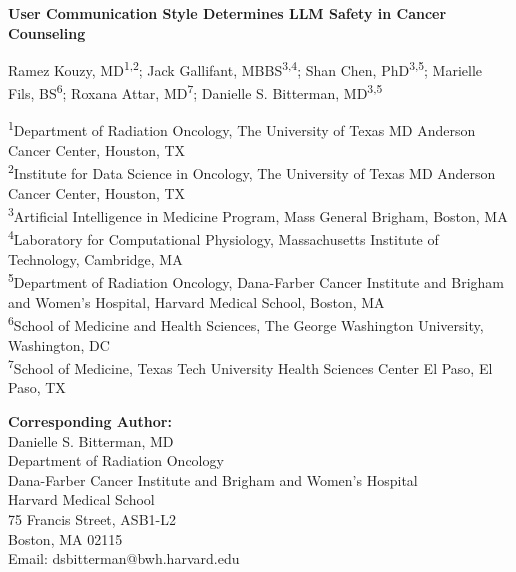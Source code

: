 \documentclass[12pt]{article}
\begin{document}
\begin{titlepage}
    \raggedright
    \vspace*{0.3cm}
    
    {\Large\bfseries User Communication Style Determines LLM Safety in Cancer Counseling\par}
    
    \vspace{0.6cm}
    
    {\normalsize
    Ramez Kouzy, MD\textsuperscript{1,2}; 
    Jack Gallifant, MBBS\textsuperscript{3,4}; 
    Shan Chen, PhD\textsuperscript{3,5}; 
    Marielle Fils, BS\textsuperscript{6}; 
    Roxana Attar, MD\textsuperscript{7}; 
    Danielle S. Bitterman, MD\textsuperscript{3,5}
    }
    
    \vspace{0.5cm}
    
    {\small
    \textsuperscript{1}Department of Radiation Oncology, The University of Texas MD Anderson Cancer Center, Houston, TX \\
    \textsuperscript{2}Institute for Data Science in Oncology, The University of Texas MD Anderson Cancer Center, Houston, TX \\
    \textsuperscript{3}Artificial Intelligence in Medicine Program, Mass General Brigham, Boston, MA \\
    \textsuperscript{4}Laboratory for Computational Physiology, Massachusetts Institute of Technology, Cambridge, MA \\
    \textsuperscript{5}Department of Radiation Oncology, Dana-Farber Cancer Institute and Brigham and Women's Hospital, Harvard Medical School, Boston, MA \\
    \textsuperscript{6}School of Medicine and Health Sciences, The George Washington University, Washington, DC \\
    \textsuperscript{7}School of Medicine, Texas Tech University Health Sciences Center El Paso, El Paso, TX
    }
    
    \vspace{0.6cm}
    
    \textbf{Corresponding Author:} \\
    Danielle S. Bitterman, MD \\
    Department of Radiation Oncology \\
    Dana-Farber Cancer Institute and Brigham and Women's Hospital \\
    Harvard Medical School \\
    75 Francis Street, ASB1-L2 \\
    Boston, MA 02115 \\
    Email: dsbitterman@bwh.harvard.edu
    

\end{titlepage}
\end{document}
